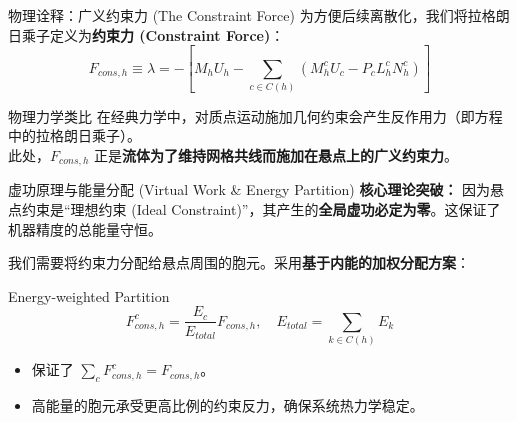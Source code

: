 \documentclass{beamer}
\begin{document}
	\begin{frame}{物理诠释：广义约束力 (The Constraint Force)}
		为方便后续离散化，我们将拉格朗日乘子定义为\textbf{约束力 (Constraint Force)}：
		\begin{equation*}
			F_{cons,h} \equiv \lambda = - \left[ M_h U_h - \sum_{c\in C(h)} (M_h^c U_c - P_c L_h^c N_h^c) \right]
		\end{equation*}
		
		\vspace{0.3cm}
		\begin{alertblock}{物理力学类比}
			在经典力学中，对质点运动施加几何约束会产生反作用力（即方程中的拉格朗日乘子）。\\
			此处，$F_{cons,h}$ 正是\textbf{流体为了维持网格共线而施加在悬点上的广义约束力}。
		\end{alertblock}
	\end{frame}
	
	\begin{frame}{虚功原理与能量分配 (Virtual Work \& Energy Partition)}
		\textbf{核心理论突破：} 因为悬点约束是“理想约束 (Ideal Constraint)”，其产生的\textbf{全局虚功必定为零}。这保证了机器精度的总能量守恒。
		\vspace{0.3cm}
		
		我们需要将约束力分配给悬点周围的胞元。采用\textbf{基于内能的加权分配方案}：
		\begin{block}{Energy-weighted Partition}
			\begin{equation*}
				F_{cons,h}^c = \frac{E_c}{E_{total}} F_{cons,h}, \quad E_{total} = \sum_{k\in C(h)} E_k
			\end{equation*}
		\end{block}
		
		\begin{itemize}
			\item 保证了 $\sum_c F_{cons,h}^c = F_{cons,h}$。
			\item 高能量的胞元承受更高比例的约束反力，确保系统热力学稳定。
		\end{itemize}
	\end{frame}
	
\end{document}
